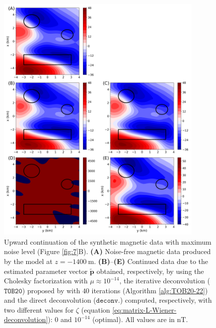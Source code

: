 \begin{figure}[htbp]
	\begin{center}
		\includegraphics[width=10cm]{Fig/mag_upward}
	\end{center}
	\caption{
		Upward continuation of the synthetic magnetic data with maximum noise level (Figure \ref{fig:7}B).
		\textbf{(A)} Noise-free magnetic data produced by the model at $z = -1400 \: \mathrm{m}$. 
		\textbf{(B)}--\textbf{(E)} Continued data due to the estimated parameter vector $\tilde{\mathbf{p}}$ obtained, respectively,
		by using the Cholesky factorization with $\mu \approx 10^{-14}$, 
		the iterative deconvolution ($\mathtt{TOB20}$) proposed by \citet{takahashi-etal2022} with $40$ 
		iterations (Algorithm \ref{alg:TOB20-22}) and
		the direct deconvolution ($\mathtt{deconv.}$) computed, respectively, with two different 
		values for $\zeta$ (equation \ref{eq:matrix-L-Wiener-deconvolution}): $0$ and $10^{-14}$ (optimal).
		All values are in $\mathrm{nT}$.
		}
	\label{fig:mag_up}
\end{figure}

